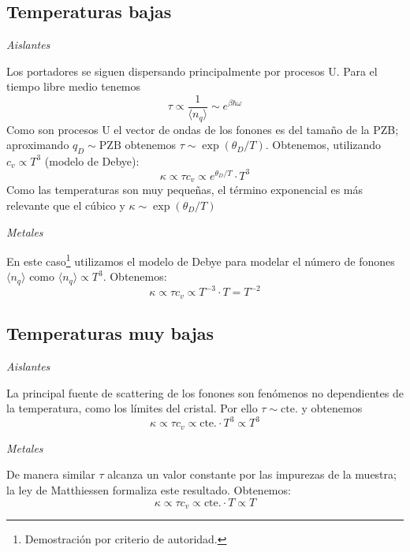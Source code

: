\subsection*{Temperaturas bajas}
\begin{flushright}
  \emph{Aislantes}
\end{flushright}
Los portadores se siguen dispersando principalmente por procesos U.
Para el tiempo libre medio tenemos
\begin{equation*}
  \tau \propto \frac{1}{\langle n_q\rangle} \sim e^{\beta \hbar \omega}
\end{equation*}
Como son procesos U el vector de ondas de los fonones es del tamaño
de la PZB; aproximando $q_{\scriptscriptstyle D} \sim \text{PZB}$
obtenemos $\tau \sim \exp(\theta_D /T)$. Obtenemos, utilizando $c_v
\propto T^3$ (modelo de Debye):
\begin{equation*}
  \kappa \propto \tau c_v \propto e^{\theta_D /T} \cdot T^3
\end{equation*}
Como las temperaturas son muy pequeñas, el término exponencial es más
relevante que el cúbico y $\kappa \sim \exp(\theta_D /T)$
\begin{flushright}
  \emph{Metales}
\end{flushright}
En este caso\footnote{Demostración por criterio de autoridad.} utilizamos el modelo de Debye para modelar el número de fonones $\langle
n_q\rangle$ como $\langle n_q \rangle \propto T^3$. Obtenemos:
\begin{equation*}
  \kappa \propto \tau c_v \propto T^{-3} \cdot T = T^{-2}
\end{equation*}

\subsection*{Temperaturas muy bajas}
\begin{flushright}
  \emph{Aislantes}
\end{flushright}
La principal fuente de scattering de los fonones son fenómenos no
dependientes de la temperatura, como los límites del
cristal. Por ello $\tau \sim \text{cte.}$ y obtenemos
\begin{equation*}
  \kappa \propto \tau c_v \propto \text{cte.} \cdot T^3 \propto T^3
\end{equation*}
\begin{flushright}
  \emph{Metales}
\end{flushright}
De manera similar $\tau$ alcanza un valor constante por las impurezas
de la muestra; la ley de Matthiessen formaliza este resultado.
Obtenemos:
\begin{equation*}
  \kappa \propto \tau c_v \propto \text{cte.} \cdot T \propto T
\end{equation*}







